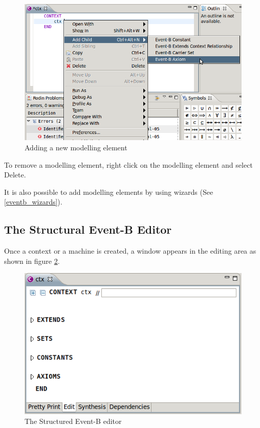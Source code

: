 \begin{figure}[!ht]
\begin{center}
	\includegraphics{img/reference/ref_01_neweditor_add_element.png}
	\caption{Adding a new modelling element}
	\label{fig_ref_01_neweditor_add_element}
\end{center}
\end{figure}

To remove a modelling element, right click on the modelling element and select \textsf{Delete}.

It is also possible to add modelling elements by using wizards (See \ref{eventb_wizards}).

\subsection{The Structural Event-B Editor}
\label{eventb_editor}


Once a context or a machine is created, a window appears in the editing area as shown in figure \ref{fig_ref_01_eventb_editor1}.

\begin{figure}[!ht]
\begin{center}
	\includegraphics{img/reference/ref_01_eventb_editor1.png}
	\caption{The Structured Event-B editor}
	\label{fig_ref_01_eventb_editor1}
\end{center}
\end{figure}

